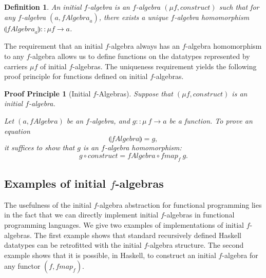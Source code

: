 \documentclass{jfp1}
\newcommand{\fold}[1]{\llparenthesis #1 \rrparenthesis}
\newtheorem{definition}{Definition}
\newtheorem{proofprinciple}{Proof Principle}
\begin{document}
\begin{definition}
  An \emph{initial $f$-algebra} is an $f$-algebra $(\mu f,
  \mathit{construct})$ such that for any $f$-algebra $(a,
  \mathit{fAlgebra}_a)$, there exists a unique $f$-algebra
  homomorphism $\fold{\mathit{fAlgebra}_a} :: \mu f \to a$.
\end{definition}

The requirement that an initial $f$-algebra always has an $f$-algebra
homomorphism to any $f$-algebra allows us to define functions on the
datatypes represented by carriers $\mu f$ of initial $f$-algebras. The
uniqueness requirement yields the following proof principle for
functions defined on initial $f$-algebras.

\begin{proofprinciple}[Initial $f$-Algebras]\label{pp:initial-alg}
  Suppose that $(\mu f, \mathit{construct})$ is an initial $f$-algebra.

  Let $(a, \mathit{fAlgebra})$ be an $f$-algebra, and $g :: \mu~f \to
  a$ be a function. To prove an equation
  \begin{displaymath}
    \fold{\mathit{fAlgebra}} = g,
  \end{displaymath}
  it suffices to show that $g$ is an $f$-algebra homomorphism:
  \begin{displaymath}
    g \circ \mathit{construct} = \mathit{fAlgebra} \circ \mathit{fmap}_f~g.
  \end{displaymath}
\end{proofprinciple}


\subsection{Examples of initial $f$-algebras}
\label{sec:example-initial-f}

The usefulness of the initial $f$-algebra abstraction for functional
programming lies in the fact that we can directly implement initial
$f$-algebras in functional programming languages. We give two examples
of implementations of initial $f$-algebras. The first example shows
that standard recursively defined Haskell datatypes can be retrofitted
with the initial $f$-algebra structure. The second example shows that
it is possible, in Haskell, to construct an initial $f$-algebra for
any functor $(f,\mathit{fmap_f})$.
\end{document}
